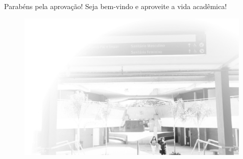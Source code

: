 Parabéns pela aprovação! Seja bem-vindo e aproveite a vida acadêmica!

\begin{figure}[hb!]
    \includegraphics[scale=0.68, keepaspectratio=true]{img/imgs/1-boas_vindas/-007.jpg}
\end{figure}


